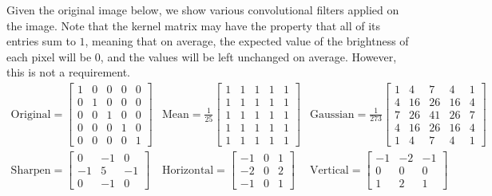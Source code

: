 \documentclass{article}
\begin{document}
    \begin{example}
      Given the original image below, we show various convolutional filters applied on the image. Note that the kernel matrix may have the property that all of its entries sum to $1$, meaning that on average, the expected value of the brightness of each pixel will be $0$, and the values will be left unchanged on average. However, this is not a requirement.  
      \begin{align*}
        \mathrm{Original} = \begin{bmatrix} 1 & 0 & 0 & 0 & 0 \\ 0 & 1 & 0 & 0 & 0 \\ 0 & 0 & 1 & 0 & 0 \\ 0 & 0 & 0 & 1 & 0 \\ 0 & 0 & 0 & 0 & 1 \end{bmatrix} & 
        \mathrm{Mean} = \frac{1}{25} \begin{bmatrix} 1 & 1 & 1 & 1 & 1 \\ 1 & 1 & 1 & 1 & 1 \\ 1 & 1 & 1 & 1 & 1 \\ 1 & 1 & 1 & 1 & 1 \\ 1 & 1 & 1 & 1 & 1 \end{bmatrix} & 
        \mathrm{Gaussian} = \frac{1}{273} \begin{bmatrix} 1 & 4 & 7 & 4 & 1 \\ 4 & 16 & 26 & 16 & 4 \\ 7 & 26 & 41 & 26 & 7 \\ 4 & 16 & 26 & 16 & 4 \\ 1 & 4 & 7 & 4 & 1 \end{bmatrix} \\   
        \mathrm{Sharpen} = \begin{bmatrix} 0 & -1 & 0 \\ -1 & 5 & -1 \\ 0 & -1 & 0 \end{bmatrix} & 
        \mathrm{Horizontal} = \begin{bmatrix} -1 & 0 & 1 \\ -2 & 0 & 2 \\ -1 & 0 & 1 \end{bmatrix} & 
        \mathrm{Vertical} = \begin{bmatrix} -1 & -2 & -1 \\ 0 & 0 & 0 \\ 1 & 2 & 1 \end{bmatrix} 
      \end{align*}


\end{example}
\end{document}
